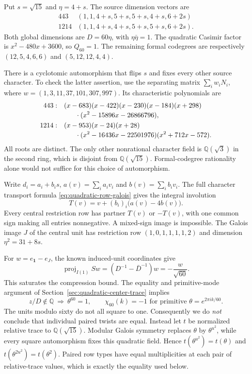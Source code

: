 Put $s=\sqrt{15}$ and $\eta=4+s$.  The source dimension vectors are
\[
\begin{array}{c|l}
443&(1,1,4+s,5+s,5+s,4+s,6+2s)\\
1214&(1,1,4+s,4+s,5+s,5+s,6+2s).
\end{array}
\]
Both global dimensions are $D=60\eta$, with $\eta\bar\eta=1$.
The quadratic Casimir factor is $x^2-480x+3600$, so $Q_{60}=1$.
The remaining formal codegrees are respectively
$(12,5,4,6,6)$ and $(5,12,12,4,4)$.

There is a cyclotomic automorphism that flips $s$ and fixes every other
source character.  To check the latter assertion, use the separating
matrix $\sum_i w_iN_i$, where $w=(1,3,11,37,101,307,997)$.
Its characteristic polynomials are
\begin{align*}
443:\quad &(x-683)(x-422)(x-230)(x-184)(x+298)\\[-2pt]
&\hspace{6mm}\cdot(x^2-15896x-26866796),\\
1214:\quad &(x-953)(x-24)(x+28)\\[-2pt]
&\hspace{6mm}\cdot(x^2-16436x-22501976)(x^2+712x-572).
\end{align*}
All roots are distinct.  The only other nonrational character field is
$\mathbb Q(\sqrt3)$ in the second ring, which is disjoint from
$\mathbb Q(\sqrt{15})$.  Formal-codegree rationality alone would not
suffice for this choice of automorphism.

Write $d_i=a_i+b_is$, $a(v)=\sum_i a_iv_i$ and $b(v)=\sum_i b_iv_i$.
The full character transport formula
\eqref{eq:quadratic-row-galois} gives the integral involution
\[
                  T(v)=v+(b_i)_i\bigl(a(v)-4b(v)\bigr).
\]
Every central restriction row has partner $T(v)$ or $-T(v)$, with one
common sign making all entries nonnegative.  A mixed-sign image is
impossible.  The Galois image $J$ of the central unit has restriction row
$(1,0,1,1,1,1,2)$ and dimension $\eta^2=31+8s$.

For $w=e_{\mathbf1}-e_J$, the known induced-unit coordinates give
\[
 \operatorname{proj}_{I(1)}Sw
 =(D^{-1}-\bar D^{-1})w=-\frac{w}{\sqrt{60}}.
\]
This saturates the compression bound.  The equality and primitive-mode
argument of Section~\ref{sec:quadratic-center-trace} implies
\[
 z/D\notin\mathbb Q\ \Longrightarrow\ \theta^{60}=1,
 \qquad \chi_{60}(k)=-1
 \text{ for primitive }\theta=e^{2\pi ik/60}.
\]
The units modulo sixty do not all square to one.  Consequently we do
\emph{not} conclude that individual paired twists are equal.  Instead let
$t$ be normalized relative trace to $\mathbb Q(\sqrt{15})$.  Modular
Galois symmetry replaces $\theta$ by $\theta^{u^2}$, while every square
automorphism fixes this quadratic field.  Hence
$t(\theta^{u^2})=t(\theta)$ and
$t(\theta^{2u^2})=t(\theta^2)$.  Paired row types have equal
multiplicities at each pair of relative-trace values, which is exactly
the equality used below.

